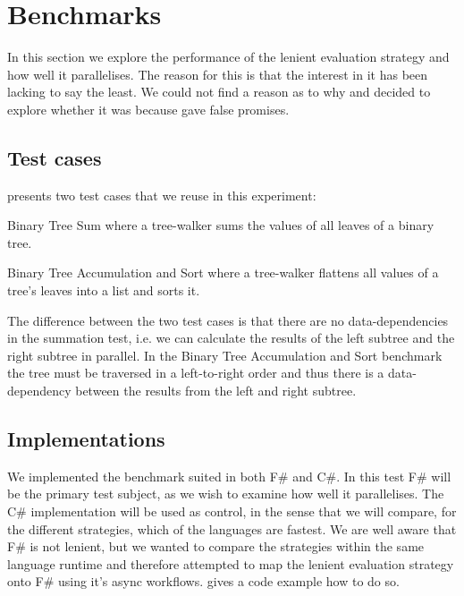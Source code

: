 \section{Benchmarks}
In this section we explore the performance of the lenient evaluation strategy and how well it parallelises. The reason for this is that the interest in it has been lacking to say the least. We could not find a reason as to why and decided to explore whether it was because \cite{DBLP:journals/cl/Tremblay-parallel} gave false promises.

\subsection{Test cases}
\cite{DBLP:journals/cl/Tremblay-parallel} presents two test cases that we reuse in this experiment:

\begin{labeling}{\quad\quad}
    \item[Binary Tree Sum] where a tree-walker sums the values of all leaves of a binary tree.
    \item[Binary Tree Accumulation and Sort] where a tree-walker flattens all values of a tree's leaves into a list and sorts it.
\end{labeling}

The difference between the two test cases is that there are no data-dependencies in the summation test, i.e. we can calculate the results of the left subtree and the right subtree in parallel. In the Binary Tree Accumulation and Sort benchmark the tree must be traversed in a left-to-right order and thus there is a data-dependency between the results from the left and right subtree.

\subsection{Implementations}
We implemented the benchmark suited in both F\# and C\#. In this test F\# will be the primary test subject, as we wish to examine how well it parallelises. The C\# implementation will be used as control, in the sense that we will compare, for the different strategies, which of the languages are fastest. We are well aware that F\# is not lenient, but we wanted to compare the strategies within the same language runtime and therefore attempted to map the lenient evaluation strategy onto F\# using it's async workflows.  gives a code example how to do so.

